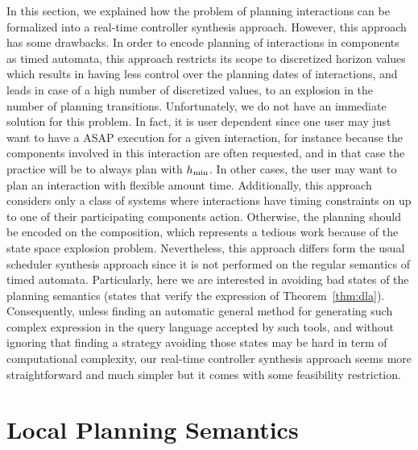 In this section, we explained how the problem of planning interactions can be formalized into
a real-time controller synthesis approach. However, this approach has some drawbacks.
In order to encode planning of interactions in components as timed automata, this approach
restricts its scope to discretized horizon values which results in having less control
over the planning dates of interactions, and leads in case of a high number of discretized 
values, to an explosion in the number of planning transitions. Unfortunately, we do not 
have an immediate solution for this problem. In fact, it is user dependent since one user may 
just want to have a ASAP execution for a given interaction, for instance because the components
involved in this interaction are often requested, and in that case the practice will be to 
always plan with $h_{\min}$. In other cases, the user may want to plan an interaction with 
flexible amount time.
Additionally, this approach considers only a class of systems where interactions have timing 
constraints on up to one of their participating components action. Otherwise, the planning 
should be encoded on the composition, which represents a tedious work because of the state 
space explosion problem. Nevertheless, this approach differs form the usual scheduler 
synthesis approach since it is not performed on the regular semantics of timed automata. 
Particularly, here we are interested in avoiding bad states of the planning semantics 
(states that verify the expression of Theorem~\ref{thm:dla}). Consequently, unless finding an 
automatic general method for generating such complex expression in the query language accepted 
by such tools, and without ignoring that finding a strategy avoiding those states 
may be hard in term of computational complexity, our real-time controller synthesis approach 
seems more straightforward and much simpler but it comes with some feasibility restriction.






\section{Local Planning Semantics}







